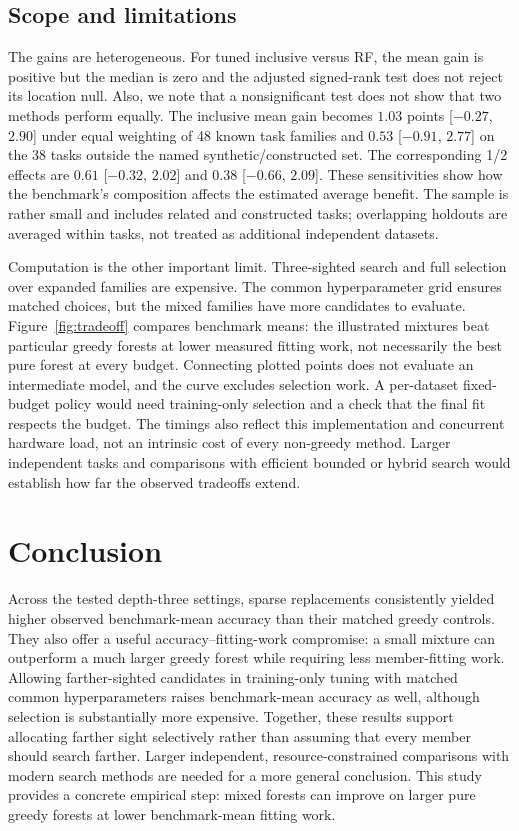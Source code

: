 \documentclass[final,5p,times]{elsarticle}
\begin{document}
\subsection{Scope and limitations}
The gains are heterogeneous. For tuned inclusive versus RF, the mean
gain is positive but the median is zero and the adjusted signed-rank test
does not reject its location null. Also, we note that a nonsignificant
test does not show that two methods perform equally. The inclusive mean
gain becomes $1.03$ points [$-0.27$, $2.90$] under equal weighting of
48 known task families and $0.53$ [$-0.91$, $2.77$] on the 38 tasks
outside the named synthetic/constructed set. The corresponding 1/2
effects are $0.61$ [$-0.32$, $2.02$] and $0.38$ [$-0.66$, $2.09$].
These sensitivities show how the benchmark's composition affects the
estimated average benefit. The sample is rather small and includes related
and constructed tasks; overlapping holdouts are averaged within tasks,
not treated as additional independent datasets.

Computation is the other important limit. Three-sighted search and full
selection over expanded families are expensive. The common hyperparameter
grid ensures matched choices, but the mixed families have more candidates
to evaluate. Figure~\ref{fig:tradeoff} compares benchmark means: the
illustrated mixtures beat particular greedy forests at lower measured
fitting work, not necessarily the best pure forest at every budget.
Connecting plotted points does not evaluate an intermediate model, and
the curve excludes selection work. A per-dataset fixed-budget policy
would need training-only selection and a check that the final fit respects
the budget. The timings also reflect this implementation and concurrent
hardware load, not an intrinsic cost of every non-greedy method. Larger
independent tasks and comparisons with efficient bounded or hybrid search
\cite{aglin2020caching,demirovic2022murtree,vanderlinden2023separable,babbar2025nearoptimal}
would establish how far the observed tradeoffs extend.

\section{Conclusion}
Across the tested depth-three settings, sparse replacements consistently
yielded higher observed benchmark-mean accuracy than their matched greedy
controls. They also offer a useful
accuracy--fitting-work compromise: a small mixture can outperform a much
larger greedy forest while requiring less member-fitting work. Allowing
farther-sighted candidates in training-only tuning with matched common
hyperparameters raises
benchmark-mean accuracy as well, although selection is substantially more
expensive. Together, these results support allocating farther sight
selectively rather than assuming that every member should search farther.
Larger independent, resource-constrained comparisons with modern search
methods are needed for a more general conclusion. This study provides a
concrete empirical step: mixed forests can improve on larger pure greedy
forests at lower benchmark-mean fitting work.
\end{document}
